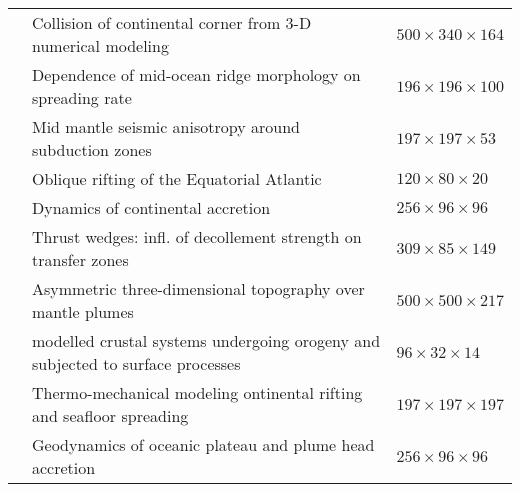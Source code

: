 {\begin{tabular}{lll}
\cite{lixg13} & Collision of continental corner from 3-D numerical modeling                     & $500 \times 340 \times 164$ \\%
\cite{puge14} & Dependence of mid-ocean ridge morphology on spreading rate                      & $196\times196\times100$ \\%
\cite{facc14} & Mid mantle seismic anisotropy around subduction zones                           & $197\times197\times53$ \\%
\cite{hebr14} & Oblique rifting of the Equatorial Atlantic                                      & $120\times80\times20$ \\%
\cite{mobm14} & Dynamics of continental accretion                                               & $256\times96\times96$ \\
\cite{rugb13} & Thrust wedges: infl. of decollement strength on transfer zones                  & $309\times85\times149$\\
\cite{buge14} & Asymmetric three-dimensional topography over mantle plumes                      & $500\times500\times217$ \\
\cite{thsh14} & modelled crustal systems undergoing orogeny and subjected to surface processes  & $96\times32\times14$\\
\cite{lige14b}& Thermo-mechanical modeling ontinental rifting and seafloor spreading            & $197\times197\times197$  \\ 
\cite{bemm15} & Geodynamics of oceanic plateau and plume head accretion                         & $256\times96\times96$ \\
\hline
\end{tabular}
}



